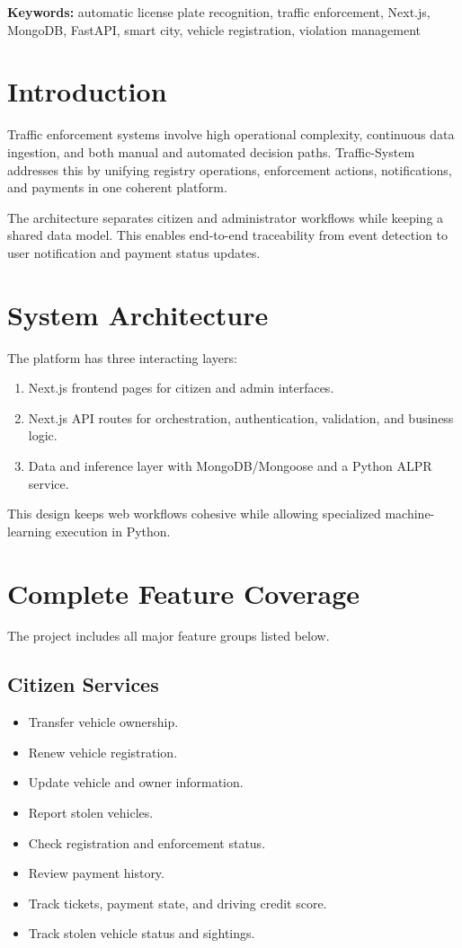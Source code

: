 \documentclass[12pt]{article}
\begin{document}
\noindent\textbf{Keywords:} automatic license plate recognition, traffic enforcement, Next.js, MongoDB, FastAPI, smart city, vehicle registration, violation management

\section{Introduction}
Traffic enforcement systems involve high operational complexity, continuous data ingestion, and both manual and automated decision paths. Traffic-System addresses this by unifying registry operations, enforcement actions, notifications, and payments in one coherent platform.

The architecture separates citizen and administrator workflows while keeping a shared data model. This enables end-to-end traceability from event detection to user notification and payment status updates.

\section{System Architecture}
The platform has three interacting layers:
\begin{enumerate}[leftmargin=*]
\item Next.js frontend pages for citizen and admin interfaces.
\item Next.js API routes for orchestration, authentication, validation, and business logic.
\item Data and inference layer with MongoDB/Mongoose and a Python ALPR service.
\end{enumerate}

This design keeps web workflows cohesive while allowing specialized machine-learning execution in Python.

\section{Complete Feature Coverage}
The project includes all major feature groups listed below.

\subsection{Citizen Services}
\begin{itemize}[leftmargin=*]
\item Transfer vehicle ownership.
\item Renew vehicle registration.
\item Update vehicle and owner information.
\item Report stolen vehicles.
\item Check registration and enforcement status.
\item Review payment history.
\item Track tickets, payment state, and driving credit score.
\item Track stolen vehicle status and sightings.
\end{itemize}
\end{document}

